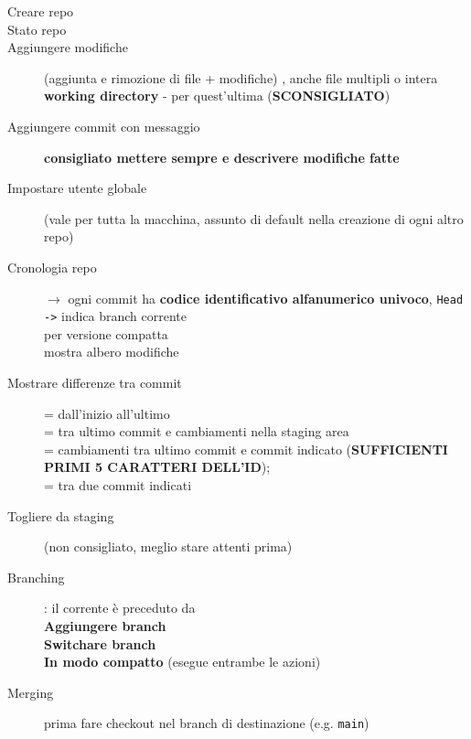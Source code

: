 \documentclass[10pt, oneside]{Book}
\begin{document}
\begin{description}
\item[Creare repo] 
\item[Stato repo] 
\item[Aggiungere modifiche] (aggiunta e rimozione di file + modifiche) , anche file multipli o intera \textbf{working directory} - per quest'ultima  (\textbf{SCONSIGLIATO})
\item[Aggiungere commit con messaggio] \textbf{consigliato mettere sempre e descrivere modifiche fatte}
\item[Impostare utente globale]   (vale per tutta la macchina, assunto di default nella creazione di ogni altro repo)
\item[Cronologia repo]  $\rightarrow$ ogni commit ha \textbf{codice identificativo alfanumerico univoco}, \texttt{Head ->} indica branch corrente
\\ per versione compatta
\\ mostra albero modifiche
\item[Mostrare differenze tra commit]  = dall'inizio all'ultimo
\\ = tra ultimo commit e cambiamenti nella staging area
\\ = cambiamenti tra ultimo commit e commit indicato (\textbf{SUFFICIENTI PRIMI 5 CARATTERI DELL'ID}); 
\\ = tra due commit indicati
\item[Togliere da staging]  (non consigliato, meglio stare attenti prima)
\item[Branching]  : il corrente è preceduto da \boxed{\texttt{\*}}
\\\textbf{Aggiungere branch} 
\\\textbf{Switchare branch} 
\\\textbf{In modo compatto}  (esegue entrambe le azioni)
\item[Merging]  prima fare checkout nel branch di destinazione (e.g. \texttt{main})

\end{description}
\end{document}
